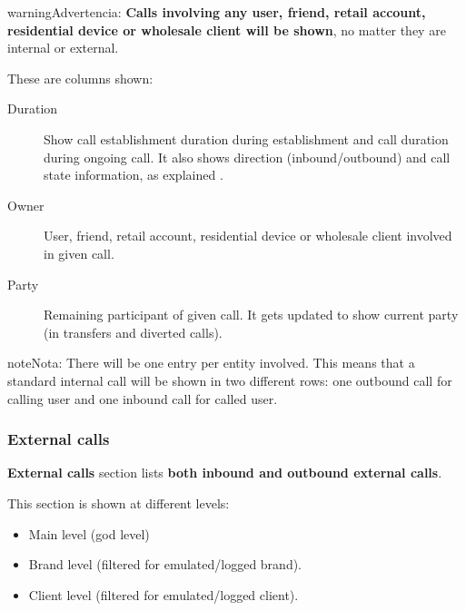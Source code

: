 \documentclass[letterpaper,10pt,spanish]{sphinxmanual}
\begin{document}
\begin{notice}{warning}{Advertencia:}
\textbf{Calls involving any user, friend, retail account, residential device or wholesale client will be shown},
no matter they are internal or external.
\end{notice}

These are columns shown:
\begin{description}
\item[{Duration}] \leavevmode{}\label{administration_portal/client/vpbx/calls/active_calls:term-duration}
Show call establishment duration during establishment and call duration during ongoing call. It also shows
direction (inbound/outbound) and call state information, as explained {\hyperref[administration_portal/platform/active_calls:call\string-state]{}}.

\item[{Owner}] \leavevmode{}\label{administration_portal/client/vpbx/calls/active_calls:term-owner}
User, friend, retail account, residential device or wholesale client involved in given call.

\item[{Party}] \leavevmode{}\label{administration_portal/client/vpbx/calls/active_calls:term-party}
Remaining participant of given call. It gets updated to show current party (in transfers and diverted calls).

\end{description}

\begin{notice}{note}{Nota:}
There will be one entry per entity involved. This means that a standard internal call will be shown
in two different rows: one outbound call for calling user and one inbound call for called user.
\end{notice}


\subsubsection{External calls}
\label{administration_portal/client/vpbx/calls/external_calls:id1}\label{administration_portal/client/vpbx/calls/external_calls::doc}\label{administration_portal/client/vpbx/calls/external_calls:external-calls}
\textbf{External calls} section lists \textbf{both inbound and outbound external calls}.

This section is shown at different levels:
\begin{itemize}
\item {} 
Main level (god level)

\item {} 
Brand level (filtered for emulated/logged brand).

\item {} 
Client level (filtered for emulated/logged client).

\end{itemize}
\end{document}
